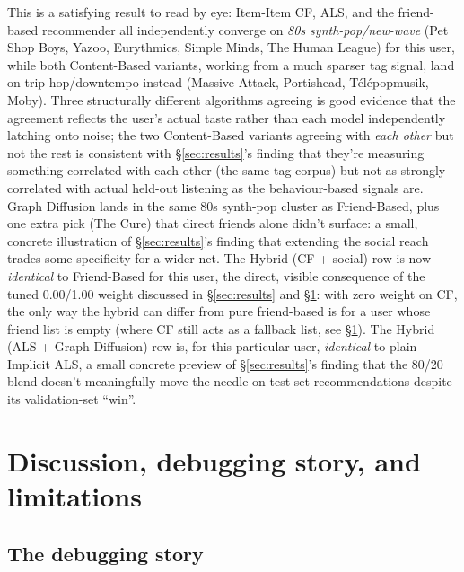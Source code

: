 \documentclass[11pt,a4paper]{article}
\newcommand{\secref}[1]{\S\ref{#1}}
\begin{document}
This is a satisfying result to read by eye: Item-Item CF, ALS, and the friend-based recommender all independently converge on \emph{80s synth-pop/new-wave} (Pet Shop Boys, Yazoo, Eurythmics, Simple Minds, The Human League) for this user, while both Content-Based variants, working from a much sparser tag signal, land on trip-hop/downtempo instead (Massive Attack, Portishead, T\'el\'epopmusik, Moby). Three structurally different algorithms agreeing is good evidence that the agreement reflects the user's actual taste rather than each model independently latching onto noise; the two Content-Based variants agreeing with \emph{each other} but not the rest is consistent with \secref{sec:results}'s finding that they're measuring something correlated with each other (the same tag corpus) but not as strongly correlated with actual held-out listening as the behaviour-based signals are. Graph Diffusion lands in the same 80s synth-pop cluster as Friend-Based, plus one extra pick (The Cure) that direct friends alone didn't surface: a small, concrete illustration of \secref{sec:results}'s finding that extending the social reach trades some specificity for a wider net. The Hybrid (CF + social) row is now \emph{identical} to Friend-Based for this user, the direct, visible consequence of the tuned 0.00/1.00 weight discussed in \secref{sec:results} and \secref{sec:discussion}: with zero weight on CF, the only way the hybrid can differ from pure friend-based is for a user whose friend list is empty (where CF still acts as a fallback list, see \secref{sec:discussion}). The Hybrid (ALS + Graph Diffusion) row is, for this particular user, \emph{identical} to plain Implicit ALS, a small concrete preview of \secref{sec:results}'s finding that the 80/20 blend doesn't meaningfully move the needle on test-set recommendations despite its validation-set ``win''.

\section{Discussion, debugging story, and limitations}
\label{sec:discussion}

\subsection{The debugging story}
\end{document}
